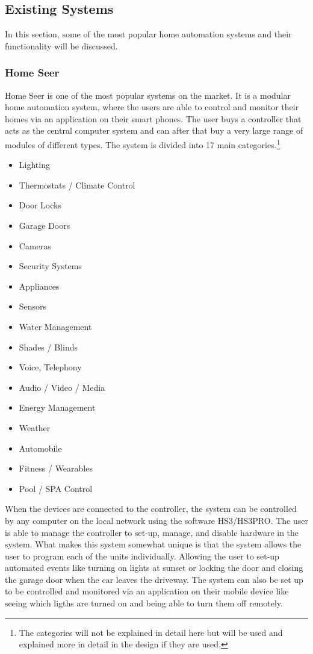 \subsection{Existing Systems}
\label{sub:existingSystems}
In this section, some of the most popular home automation systems and their functionality will be discussed.

\subsubsection{Home Seer}
Home Seer is one of the most popular systems on the market. It is a modular home automation system, where the users are able to control and monitor their homes via an application on their smart phones. The user buys a controller that acts as the central computer system and can after that buy a very large range of modules of different types. The system is divided into 17 main categories.\footnote{The categories will not be explained in detail here but will be used and explained more in detail in the design if they are used.}
\begin{itemize}
	\item Lighting
	\item Thermostats / Climate Control
	\item Door Locks
	\item Garage Doors
	\item Cameras
	\item Security Systems
	\item Appliances
	\item Sensors
	\item Water Management
	\item Shades / Blinds
	\item Voice, Telephony
	\item Audio / Video / Media
	\item Energy Management
	\item Weather
	\item Automobile
	\item Fitness / Wearables
	\item Pool / SPA Control
\end{itemize}%
When the devices are connected to the controller, the system can be controlled by any computer on the local network using the software HS3/HS3PRO. The user is able to manage the controller to set-up, manage, and disable hardware in the system. What makes this system somewhat unique is that the system allows the user to program each of the units individually. Allowing the user to set-up automated events like turning on lights at sunset or locking the door and closing the garage door when the car leaves the driveway. The system can also be set up to be controlled and monitored via an application on their mobile device like seeing which ligths are turned on and being able to turn them off remotely.%

